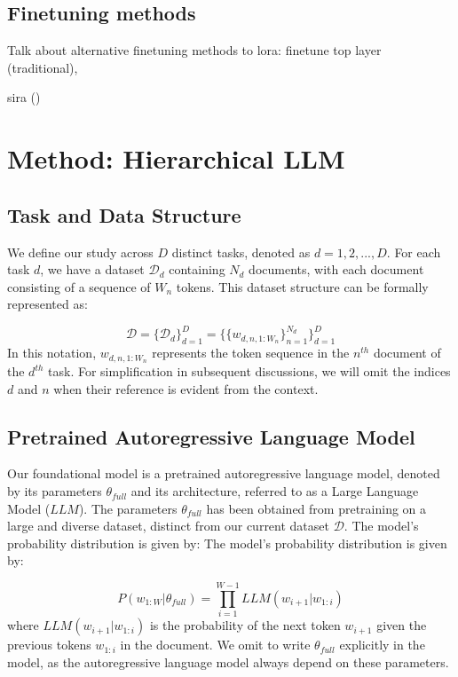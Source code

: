 \documentclass{article}
\begin{document}
\subsection{Finetuning methods}
Talk about alternative finetuning methods to lora: finetune top layer (traditional), 

sira (\cite{zhu_sira_2023})

\section{Method: Hierarchical LLM}

\subsection{Task and Data Structure}
We define our study across $D$ distinct tasks, denoted as $d=1,2,...,D$. For each task $d$, we have a dataset $\mathcal{D}_d$ containing $N_d$ documents, with each document consisting of a sequence of $W_n$ tokens. This dataset structure can be formally represented as:

\begin{equation} \label{eq:data}
\mathcal{D} = \{ \mathcal{D}_d \}_{d=1}^D  =  \{ \{ w_{d,n,1:W_n} \}_{n=1}^{N_d} \}_{d=1}^D
\end{equation}
%
In this notation, $w_{d,n,1:W_n}$ represents the token sequence in the $n^{th}$ document of the $d^{th}$ task. For simplification in subsequent discussions, we will omit the indices $d$ and $n$ when their reference is evident from the context.

\subsection{Pretrained Autoregressive Language Model}
Our foundational model is a pretrained autoregressive language model, denoted by its parameters $\theta_{full}$ and its architecture, referred to as a Large Language Model ($LLM$). The parameters $\theta_{full}$ has been obtained from pretraining on a large and diverse dataset, distinct from our current dataset $\mathcal{D}$. The model's probability distribution is given by:
The model's probability distribution is given by:

\begin{equation} \label{eq:LLMprob}
P(w_{1:W} | \theta_{full}) = \prod_{i=1}^{W-1} LLM(w_{i+1} | w_{1:i})
\end{equation}
%
where $LLM(w_{i+1} | w_{1:i})$ is the probability of the next token $w_{i+1}$ given the previous tokens $w_{1:i}$ in the document.
We omit to write $\theta_{full}$ explicitly in the model, as the autoregressive language model always depend on these parameters.
\end{document}

